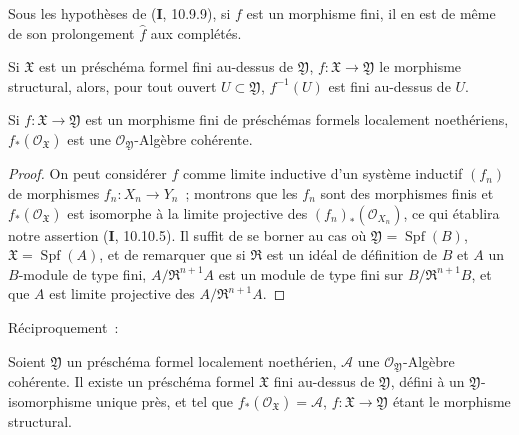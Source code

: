 \begin{corollary}[4.8.4]
\label{III.4.8.4-fr}
Sous les hypothèses de \textup{(\textbf{I}, 10.9.9)}, si $f$ est un morphisme fini, il en est de
même de son prolongement $\widehat f$ aux complétés.
\end{corollary}

\begin{corollary}[4.8.5]
\label{III.4.8.5-fr}
Si $\mathfrak X$ est un préschéma formel fini au-dessus de $\mathfrak Y$,
$f:\mathfrak X\to\mathfrak Y$ le morphisme structural, alors, pour tout ouvert
$U\subset\mathfrak Y$, $f^{-1}(U)$ est fini au-dessus de $U$.
\end{corollary}

\begin{proposition}[4.8.6]
\label{III.4.8.6-fr}
Si $f:\mathfrak X\to\mathfrak Y$ est un morphisme fini de préschémas formels
localement noethériens, $f_*(\mathcal O_{\mathfrak X})$ est une
$\mathcal O_{\mathfrak Y}$-Algèbre cohérente.
\end{proposition}

\begin{proof}
On peut considérer $f$ comme limite inductive d'un système inductif $(f_n)$ de
morphismes $f_n:X_n\to Y_n$~; montrons que les $f_n$ sont des morphismes finis
et $f_*(\mathcal O_{\mathfrak X})$ est isomorphe à la limite projective des
$(f_n)_*(\mathcal O_{X_n})$, ce qui établira notre assertion (\textbf{I}, 10.10.5). Il
suffit de se borner au cas où $\mathfrak Y=\operatorname{Spf}(B)$,
$\mathfrak X=\operatorname{Spf}(A)$, et de remarquer que si $\mathfrak R$ est
un idéal de définition de $B$ et $A$ un $B$-module de type fini,
$A/\mathfrak R^{n+1}A$ est un module de type fini sur
$B/\mathfrak R^{n+1}B$, et que $A$ est limite projective des
$A/\mathfrak R^{n+1}A$.
\end{proof}

Réciproquement~:

\begin{proposition}[4.8.7]
\label{III.4.8.7-fr}
Soient $\mathfrak Y$ un préschéma formel localement noethérien, $\mathcal A$
une $\mathcal O_{\mathfrak Y}$-Algèbre cohérente. Il existe un préschéma
formel $\mathfrak X$ fini au-dessus de $\mathfrak Y$, défini à un
$\mathfrak Y$-isomorphisme unique près, et tel que
$f_*(\mathcal O_{\mathfrak X})=\mathcal A$, $f:\mathfrak X\to\mathfrak Y$
étant le morphisme structural.
\end{proposition}

